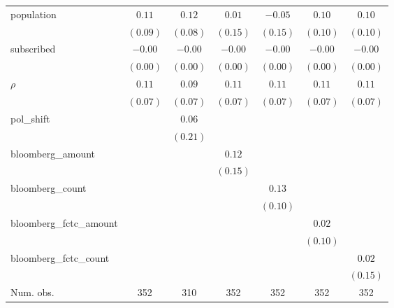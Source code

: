 \begin{table}[!h]
\begin{center}
\begin{tabular}{l c c c c c c }
population              & $0.11$       & $0.12$       & $0.01$       & $-0.05$      & $0.10$       & $0.10$       \\
                        & $(0.09)$     & $(0.08)$     & $(0.15)$     & $(0.15)$     & $(0.10)$     & $(0.10)$     \\
subscribed              & $-0.00$      & $-0.00$      & $-0.00$      & $-0.00$      & $-0.00$      & $-0.00$      \\
                        & $(0.00)$     & $(0.00)$     & $(0.00)$     & $(0.00)$     & $(0.00)$     & $(0.00)$     \\
$\rho$                  & $0.11$       & $0.09$       & $0.11$       & $0.11$       & $0.11$       & $0.11$       \\
                        & $(0.07)$     & $(0.07)$     & $(0.07)$     & $(0.07)$     & $(0.07)$     & $(0.07)$     \\
pol\_shift              &              & $0.06$       &              &              &              &              \\
                        &              & $(0.21)$     &              &              &              &              \\
bloomberg\_amount       &              &              & $0.12$       &              &              &              \\
                        &              &              & $(0.15)$     &              &              &              \\
bloomberg\_count        &              &              &              & $0.13$       &              &              \\
                        &              &              &              & $(0.10)$     &              &              \\
bloomberg\_fctc\_amount &              &              &              &              & $0.02$       &              \\
                        &              &              &              &              & $(0.10)$     &              \\
bloomberg\_fctc\_count  &              &              &              &              &              & $0.02$       \\
                        &              &              &              &              &              & $(0.15)$     \\
\midrule
Num. obs.               & 352          & 310          & 352          & 352          & 352          & 352          \\

\end{tabular}
\end{center}
\end{table}
